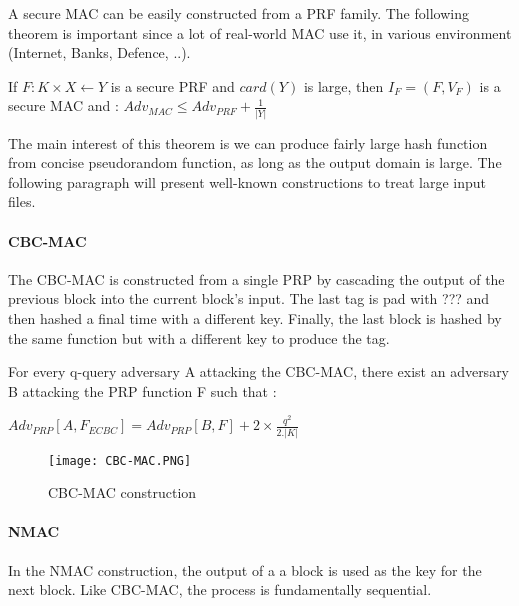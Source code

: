 A secure MAC can be easily constructed from a PRF family. The following theorem is important since a lot of real-world MAC use it, in various environment (Internet, Banks, Defence, ..). 

\begin{mytheorem}
    If $F:K\times X \leftarrow Y$ is a secure PRF and $card(Y)$ is large, 
    then $I_F = (F, V_F)$ is a secure MAC and : 
\flushright	    $ Adv_{MAC} \leq Adv_{PRF} + \frac{1}{|Y|} $
\end{mytheorem}

The main interest of this theorem is we can produce fairly large hash function from concise pseudorandom function, as long as the output domain is large. The following paragraph will present well-known constructions to treat large input files.

\paragraph{CBC-MAC}



The CBC-MAC is constructed from a single PRP by cascading the output of the previous block into the current block's input. The last tag is pad with ??? and then hashed a final time with a different key. Finally, the last block is hashed by the same function but with a different key to produce the tag.

\begin{mytheorem}
	For every q-query adversary A attacking the CBC-MAC, there exist an adversary B attacking the PRP function F such that : 
	\begin{flushright}
 		$Adv_{PRP}[A,F_{ECBC}] = Adv_{PRP}[B, F] + 2\times \frac{q^2}{2.|K|}$	
	\end{flushright}
\end{mytheorem}

\begin{figure}[!ht]
	\centering
		\texttt{[image: CBC-MAC.PNG]}
	\caption{CBC-MAC construction}
	\label{fig:CBCMACConstruction}
\end{figure}

\paragraph{NMAC}


In the NMAC construction, the output of a a block is used as the key for the next block. Like CBC-MAC, the process is fundamentally sequential.


